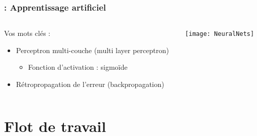 \documentclass[aspectratio=169]{beamer}
\begin{document}
\begin{frame}
  \frametitle{\insertsection : Apprentissage artificiel}

\begin{columns}
  \begin{column}{0.5\textwidth}
    Vos mots clés : 
    \begin{itemize}
      \item Perceptron multi-couche (multi layer perceptron)
      \begin{itemize}
        \item Fonction d'activation : sigmoïde
      \end{itemize}
      \item Rétropropagation de l'erreur (backpropagation)
    \end{itemize}
  \end{column}
  \begin{column}{0.6\textwidth}
    \begin{center}
      \texttt{[image: NeuralNets]}
    \end{center}
  \end{column}
\end{columns}



  

\end{frame}


\section{Flot de travail}
\end{document}
